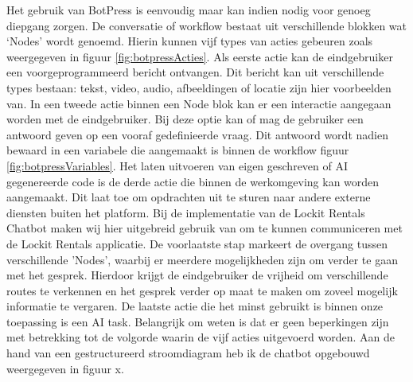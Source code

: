 Het gebruik van BotPress is eenvoudig maar kan indien nodig voor genoeg diepgang zorgen. De conversatie of workflow bestaat uit verschillende blokken wat ‘Nodes’ wordt genoemd. Hierin kunnen vijf types van acties gebeuren zoals weergegeven in figuur \ref{fig:botpressActies}. Als eerste actie kan de eindgebruiker een voorgeprogrammeerd bericht ontvangen. Dit bericht kan uit verschillende types bestaan: tekst, video, audio, afbeeldingen of locatie zijn hier voorbeelden van. In een tweede actie binnen een Node blok kan er een interactie aangegaan worden met de eindgebruiker. Bij deze optie kan of mag de gebruiker een antwoord geven op een vooraf gedefinieerde vraag. Dit antwoord wordt nadien bewaard in een variabele die aangemaakt is binnen de workflow figuur \ref{fig:botpressVariables}. Het laten uitvoeren van eigen geschreven of \ac{AI} gegenereerde code is de derde actie die binnen de werkomgeving kan worden aangemaakt. Dit laat toe om opdrachten uit te sturen naar andere externe diensten buiten het platform. Bij de implementatie van de Lockit Rentals Chatbot maken wij hier uitgebreid gebruik van om te kunnen communiceren met de Lockit Rentals applicatie. De voorlaatste stap markeert de overgang tussen verschillende 'Nodes', waarbij er meerdere mogelijkheden zijn om verder te gaan met het gesprek. Hierdoor krijgt de eindgebruiker de vrijheid om verschillende routes te verkennen en het gesprek verder op maat te maken om zoveel mogelijk informatie te vergaren. De laatste actie die het minst gebruikt is binnen onze toepassing is een \ac{AI} task. 
Belangrijk om weten is dat er geen beperkingen zijn met betrekking tot de volgorde waarin de vijf acties uitgevoerd worden. Aan de hand van een gestructureerd stroomdiagram heb ik de chatbot opgebouwd weergegeven in figuur x. 


